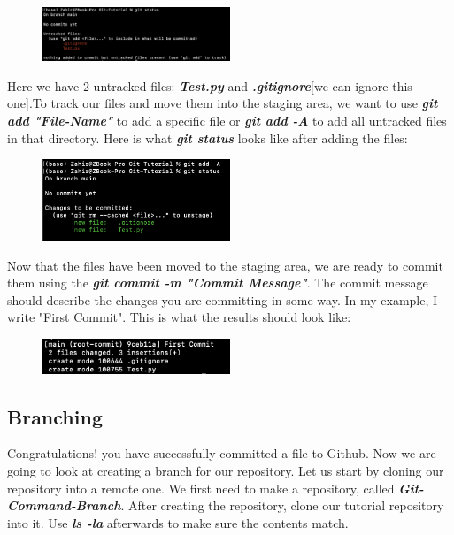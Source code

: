 \documentclass{article}
\begin{document}
\begin{figure}[h]
    \centering
    \includegraphics[width=0.5\textwidth]{CM.png}
\end{figure}

Here we have 2 untracked files: \textit{\textbf{Test.py}} and \textit{\textbf{.gitignore}}[we can ignore this one].To track our files and move them into the staging area, we want to use  \textit{\textbf{git add "File-Name"}} to add a specific file or \textit{\textbf{git add -A}} to add all untracked files in that directory. 
Here is what \textit{\textbf{git status}} looks like after adding the files:

\begin{figure}[h]
    \centering
    \includegraphics[width=0.5\textwidth]{ad.png}
\end{figure}

\vspace{150pt}

Now that the files have been moved to the staging area, we are ready to commit them using the \textit{\textbf{git commit -m "Commit Message"}}. The commit message should describe the changes you are committing in some way. In my example, I write "First Commit". This is what the results should look like:

\begin{figure}[h]
    \centering
    \includegraphics[width=0.5\textwidth]{Com.png}
\end{figure}

\subsection*{Branching}

Congratulations! you have successfully committed a file to Github. Now we are going to look at creating a branch for our repository. Let us start by cloning our repository into a remote one. We first need to make a repository, called \textit{\textbf{Git-Command-Branch}}. After creating the repository, clone our tutorial repository into it. Use \textit{\textbf{ls -la}} afterwards to make sure the contents match.
\end{document}
